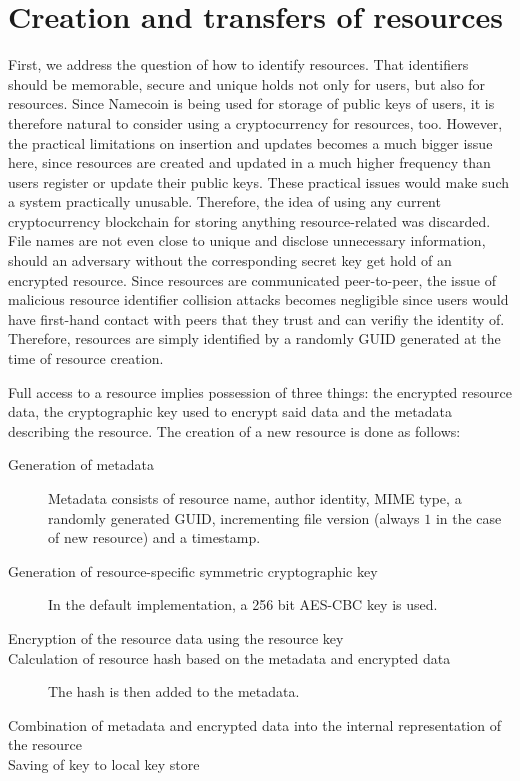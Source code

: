 \section{Creation and transfers of resources}
\label{sec:creationofresources}
First, we address the question of how to identify resources. That identifiers should be memorable, secure and unique holds not only for users, but also for resources. Since Namecoin is being used for storage of public keys of users, it is therefore natural to consider using a cryptocurrency for resources, too. However, the practical limitations on insertion and updates becomes a much bigger issue here, since resources are created and updated in a much higher frequency than users register or update their public keys. These practical issues would make such a system practically unusable. Therefore, the idea of using any current cryptocurrency blockchain for storing anything resource-related was discarded. File names are not even close to unique and disclose unnecessary information, should an adversary without the corresponding secret key get hold of an encrypted resource. Since resources are communicated peer-to-peer, the issue of malicious resource identifier collision attacks becomes negligible since users would have first-hand contact with peers that they trust and can verifiy the identity of. Therefore, resources are simply identified by a randomly GUID generated at the time of resource creation.

Full access to a resource implies possession of three things: the encrypted resource data, the cryptographic key used to encrypt said data and the metadata describing the resource. The creation of a new resource is done as follows:

\begin{description}
  \item[Generation of metadata] Metadata consists of resource name, author identity, MIME type, a randomly generated GUID, incrementing file version (always $1$ in the case of new resource) and a timestamp.
  \item[Generation of resource-specific symmetric cryptographic key] In the default implementation, a 256 bit AES-CBC key is used.
  \item[Encryption of the resource data using the resource key]
  \item[Calculation of resource hash based on the metadata and encrypted data] The hash is then added to the metadata.
  \item[Combination of metadata and encrypted data into the internal representation of the resource]
  \item[Saving of key to local key store]
\end{description}

